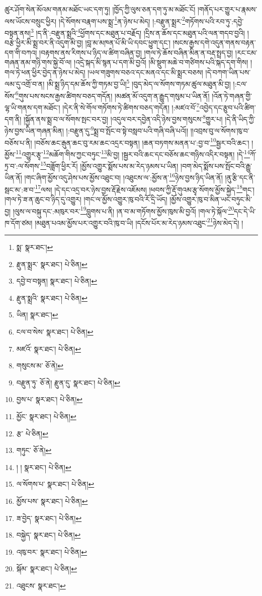 ཚུར་ཤོག་སེན་མོའམ་གནམ་མཐོང་ཡང་དག་ཏུ། །ཁྱོད་ཀྱི་ལུས་ཅན་དག་ཏུ་མ་མཐོང་ངོ། །གནོད་པར་གྱུར་པ་རྣམས་ལས་ཡོངས་བསྲུང་ཕྱིར། །དེ་སོགས་བརྣག་པས་སྨྲ་\footnote{སྨ་  སྣར་ཐང་། }ན་ཉེས་པ་མེད། །:བརྫུན་སྨྲར་\footnote{རྫུན་སྨྲར་  སྣར་ཐང་།  པེ་ཅིན། }གཏོགས་པའི་རབ་ཏུ་:དབྱེ་བསྟན་ནས།\footnote{དབྱེ་བ་བསྟན།  སྣར་ཐང་།  པེ་ཅིན། } །ད་ནི་:བརྫུན་སྨྲའི་\footnote{རྫུན་སྨྲའི་  སྣར་ཐང་།  པེ་ཅིན། }ཕྱོགས་དང་མཐུན་པ་བརྗོད། །དྲིས་ན་ཆོས་དང་མཐུན་པའི་ལན་གདབ་བྱའི། །བརྩེ་ཕྱིར་མི་སྨྲ་བར་ནི་འདུག་མི་བྱ། །བླ་མ་མཁན་པོ་མི་ཡི་དབང་ཕྱུག་དང་། །སངས་རྒྱས་དགེ་འདུན་གནས་བརྟན་དག་གི་བཀའ། །བརྟགས་ནས་རིགས་པ་ཉིད་ལ་ཚིག་བཞིན་བྱ། །གལ་ཏེ་ཆོས་བཞིན་མིན་ན་བརྡ་སྤྲད་བྱ། །རང་ངམ་གཞན་ནམ་གཉི་གས་སྐྱེ་བོ་ལ། །འདྲེ་སྐད་མི་སྙན་པ་དག་མི་བྱའོ། །མི་སྡུག་མཆེ་བ་གཙིགས་པའི་སྐད་དག་གིས། །གལ་ཏེ་ཕན་ཕྱིར་བྱེད་ན་ཉེས་པ་མེད། །ཡལ་གཟུགས་བཅའ་དང་མནའ་དང་མི་སྨྲར་བཅས། །དེ་བཀག་ཡིན་པས་ལམ་དུ་འགྲོ་བ་ན། །མི་སྨྲ་ཉིད་དམ་ཆོས་ཀྱི་གཏམ་བྱ་ཡི།\footnote{ཡིན།  སྣར་ཐང་། } །བུད་མེད་ལ་སོགས་གཏམ་ཚུལ་མཐུན་མི་བྱ། །:ངལ་སོས་\footnote{ངལ་བ་སེས་  སྣར་ཐང་།  པེ་ཅིན། }གུས་པས་སངས་རྒྱས་ཚིགས་བཅད་གདོན། །མཚན་མོ་འདུག་ན་རྒྱུད་གསུམ་པ་ཡིན་ནོ། །འོན་ཏེ་གཞན་གྱི་ལྷ་ཡི་གནས་དག་མཐོང་། །དེར་ནི་སེ་གོལ་གཏོགས་ཏེ་ཚིགས་བཅད་གདོན། །:མཛའ་བོ་\footnote{མཛའོ་  སྣར་ཐང་།  པེ་ཅིན། }འབྱེད་དང་རྩུབ་པའི་ཚིག་དག་ནི། །སྐྱོན་ནས་སྨྲ་བ་ལ་སོགས་སྤང་བར་བྱ། །འདུལ་བར་དབྱེན་འདི་ཉེས་བྱས་གསུངས་\footnote{གསུངས་མ་  ཅོ་ནེ། }གྱུར་པ། །དེ་ནི་ཡིད་ཀྱི་ཉེས་བྱས་ཡིན་གཞན་མིན། །:བརྫུན་དུ་\footnote{བརྫུན་ཏུ་  ཅོ་ནེ། རྫུན་དུ་  སྣར་ཐང་།  པེ་ཅིན། }སྨྲ་བ་སྤོང་བ་སྟེ་བསླབ་པའི་གཞི་བཞི་པའོ།། །།འབྲས་བུ་ལ་སོགས་ཁུ་བ་བཅོས་པ་ནི། །བཅོས་ཆང་རྒུན་ཆང་བུ་རམ་ཆང་འདྲར་བསྟན། །ཆན་བཏགས་མནན་པ་:བྱ་བ་\footnote{བྱས་པ་  སྣར་ཐང་།  པེ་ཅིན། }སྦྱར་བའི་ཆང་། །མྱོས་\footnote{མྱོང་  སྣར་ཐང་།  པེ་ཅིན། }འགྱུར་རྩྭ་\footnote{རྩ་  པེ་ཅིན། }མཆོག་གིས་ཀྱང་བཏུང་\footnote{གཏུང་  ཅོ་ནེ། }མི་བྱ། །སྦྱར་བའི་ཆང་དང་བཅོས་ཆང་གཉིས་འདིར་བསྟན། །དེ་\footnote{། །  སྣར་ཐང་།  པེ་ཅིན། }ཀོ་ཏྲ་བ་:ལ་སོགས་\footnote{ལ་སོགས་པ་  སྣར་ཐང་།  པེ་ཅིན། }བཟློག་ཕྱིར་རོ། །མྱོས་འགྱུར་སྨོས་པས་མ་རེད་ཉམས་པ་ཡིན། །བག་མེད་སྨོས་པས་སྤོང་བའི་རྒྱུ་ཡིན་ནོ། །གང་ཞིག་མྱོས་འདུ་ཤེས་པས་མྱོས་འཐུང་བ། །འཐུངས་ལ་:མྱོས་ན་\footnote{མྱོས་པས་  སྣར་ཐང་།  པེ་ཅིན། }ཉེས་བྱས་ཉིད་ཡིན་ནོ། །ནུ་རྩི་དང་ནི་སྦང་མ་:ཟ་བ་\footnote{ཟ་བྱེད་  སྣར་ཐང་།  པེ་ཅིན། }ལས། །དེ་དང་འདྲ་བར་ཉེས་བྱས་རྡོ་རྗེས་འཇོམས། །ཕབས་ཀྱི་རྡོ་གུའམ་རྩྭ་སོགས་མྱོས་སྐྱེད་\footnote{བསྐྱེད་  སྣར་ཐང་།  པེ་ཅིན། }གང་། །གལ་ཏེ་ཟ་ན་ཆུང་བ་ཉིད་དུ་འགྱུར། །གང་ལ་མྱོས་འགྱུར་ཁུ་བའི་རོ་དྲི་ཡོད། །མྱོས་འགྱུར་ཁུ་བ་མིན་ཡང་བཏུང་མི་བྱ། །ལུས་ལ་བསྐུ་དང་:མཁུར་བར་\footnote{འཁུ་བར་  སྣར་ཐང་།  པེ་ཅིན། }བླུགས་པ་ནི། །ན་བ་མ་གཏོགས་མྱོས་ཁུས་མི་བྱའོ། །གལ་ཏེ་སྐོལ་\footnote{སྐོམ་  སྣར་ཐང་།  པེ་ཅིན། }དང་དེ་ཡི་ཁ་དོག་ཙམ། །མཐུན་པའམ་མྱོས་པར་འགྱུར་བའི་ཁུ་བ་ཡི། །དངོས་པོར་མ་རེད་ཉམས་འཐུང་\footnote{འཐུངས་  སྣར་ཐང་། }ཉེས་མེད་དེ། །
